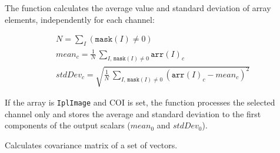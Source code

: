 
\begin{description}
\ifC
{}
\fi
{}
\ifPy
{}
\fi

\end{description}

The function calculates the average value and standard deviation of array elements, independently for each channel:

\[
\begin{array}{l}
N = \sum_I (\texttt{mask}(I) \ne 0)\\
mean_c = \frac{1}{N} \, \sum_{ I, \, \texttt{mask}(I) \ne 0} \texttt{arr}(I)_c\\
stdDev_c = \sqrt{\frac{1}{N} \, \sum_{ I, \, \texttt{mask}(I) \ne 0} (\texttt{arr}(I)_c - mean_c)^2}
\end{array}
\]

If the array is \texttt{IplImage} and COI is set, the function processes the selected channel only and stores the average and standard deviation to the first components of the output scalars ($mean_0$ and $stdDev_0$).

Calculates covariance matrix of a set of vectors.


